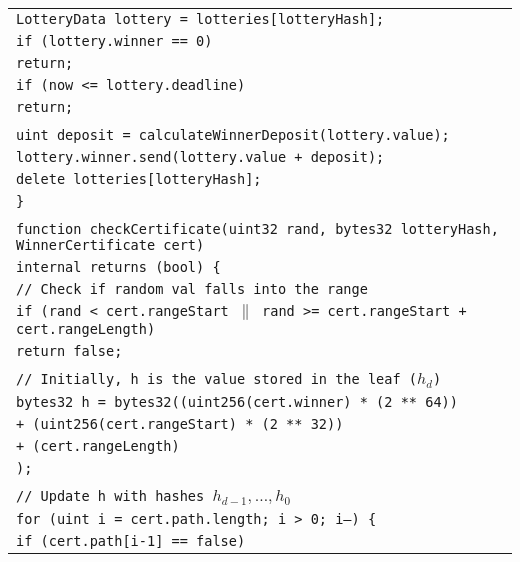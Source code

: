 \documentclass[a4paper]{article}
\begin{document}
\begin{tabularx}{\linewidth}{l}
        \qquad\qquad\texttt{LotteryData lottery = lotteries[lotteryHash];}\\
        \qquad\qquad\texttt{if (lottery.winner == 0)}\\
        \qquad\qquad\qquad\texttt{return;}\\
        \qquad\qquad\texttt{if (now <= lottery.deadline)}\\
        \qquad\qquad\qquad\texttt{return;}\\
        \\
        \qquad\qquad\texttt{uint deposit = calculateWinnerDeposit(lottery.value);}\\
        \qquad\qquad\texttt{lottery.winner.send(lottery.value + deposit);}\\
        \qquad\qquad\texttt{delete lotteries[lotteryHash];}\\
        \qquad\texttt{\}}\\
        \\
        \qquad\texttt{function checkCertificate(uint32 rand, bytes32 lotteryHash, WinnerCertificate cert)}\\
        \qquad\qquad\qquad\qquad\qquad\qquad\qquad\qquad\texttt{internal returns (bool) \{}\\
        \qquad\qquad\texttt{// Check if~random val falls into~the~range}\\
        \qquad\qquad\texttt{if (rand < cert.rangeStart $\|$ rand >= cert.rangeStart + cert.rangeLength)}\\
        \qquad\qquad\qquad\texttt{return false;}\\
        \\
        \qquad\qquad\texttt{// Initially, h is~the~value stored in~the~leaf ($h_d$)}\\
        \qquad\qquad\texttt{bytes32 h = bytes32((uint256(cert.winner) * (2 ** 64))}\\
        \qquad\qquad\qquad\qquad\qquad\qquad\texttt{+ (uint256(cert.rangeStart) * (2 ** 32))}\\
        \qquad\qquad\qquad\qquad\qquad\qquad\texttt{+ (cert.rangeLength)}\\
        \qquad\qquad\qquad\qquad\qquad\texttt{);}\\
        \\
        \qquad\qquad\texttt{// Update h with~hashes $h_{d-1}, \ldots, h_0$}\\
        \qquad\qquad\texttt{for (uint i = cert.path.length; i > 0; i--) \{}\\
        \qquad\qquad\qquad\texttt{if (cert.path[i-1] == false)}\\

\end{tabularx}
\end{document}
